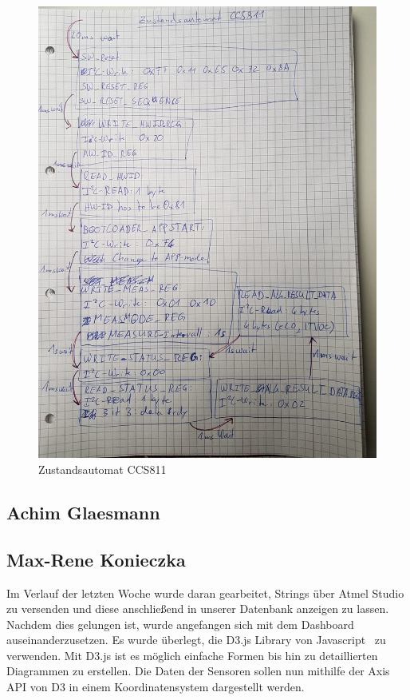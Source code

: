 \documentclass[]{article}
\begin{document}
\begin{figure}[h]
	\centering
	\includegraphics[scale=0.20]{images/zustandsautomat_ccs811}
	\caption{Zustandsautomat CCS811}
	\label{img:Zustandsautomat}
\end{figure}

\subsection{Achim Glaesmann}


\subsection{Max-Rene Konieczka}
Im Verlauf der letzten Woche wurde daran gearbeitet, Strings über Atmel Studio zu versenden und diese anschließend in unserer Datenbank anzeigen zu lassen. Nachdem dies gelungen ist, wurde angefangen sich mit dem Dashboard auseinanderzusetzen. Es wurde überlegt, die D3.js Library von Javascript~\cite{D3JS} zu verwenden. Mit D3.js ist es möglich einfache Formen bis hin zu detaillierten Diagrammen zu erstellen.
Die Daten der Sensoren sollen nun mithilfe der Axis API von D3 in einem Koordinatensystem dargestellt werden. 
\end{document}
